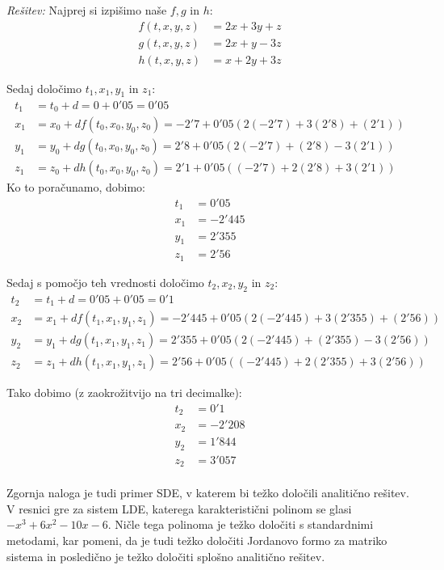 \documentclass[a4paper, 10pt]{article}
\newenvironment{resitev}{\begin{flushleft}\textit{Rešitev:}}{\hfill\end{flushleft}}
\begin{document}
		\begin{resitev}
			Najprej si izpišimo naše $f, g$ in $h$: \begin{align*}
				f(t, x, y, z) &= 2x + 3y + z\\
				g(t, x, y, z) &= 2x + y - 3z\\
				h(t, x, y, z) &= x + 2y + 3z
			\end{align*}
			
			Sedaj določimo $t_1, x_1, y_1$ in $z_1$: \begin{align*}
				t_1 &= t_0 + d = 0 + 0'05 = 0'05 \\
				x_1 &= x_0 + df(t_0, x_0, y_0, z_0) = -2'7 + 0'05(2(-2'7) + 3(2'8) + (2'1)) \\
				y_1 &= y_0 + dg(t_0, x_0, y_0, z_0) = 2'8 + 0'05(2(-2'7) + (2'8) - 3(2'1))\\
				z_1 &= z_0 + dh(t_0, x_0, y_0, z_0) = 2'1 + 0'05((-2'7) + 2(2'8) + 3(2'1))
			\end{align*}
			Ko to poračunamo, dobimo: \begin{align*}
				t_1 &= 0'05 \\
				x_1 &= -2'445 \\
				y_1 &= 2'355 \\
				z_1 &= 2'56 
			\end{align*}
			
			Sedaj s pomočjo teh vrednosti določimo $t_2, x_2, y_2$ in $z_2$:
			\begin{align*}
				t_2 &= t_1 + d = 0'05 + 0'05 = 0'1 \\
				x_2 &= x_1 + df(t_1, x_1, y_1, z_1) = -2'445 + 0'05(2(-2'445) + 3(2'355) + (2'56)) \\
				y_2 &= y_1 + dg(t_1, x_1, y_1, z_1) = 2'355 + 0'05(2(-2'445) + (2'355) - 3(2'56)) \\
				z_2 &= z_1 + dh(t_1, x_1, y_1, z_1) = 2'56 + 0'05((-2'445) + 2(2'355) + 3(2'56))
			\end{align*}
			
			Tako dobimo (z zaokrožitvijo na tri decimalke):
			\begin{align*}
				t_2 &= 0'1 \\
				x_2 &= -2'208 \\
				y_2 &= 1'844 \\
				z_2 &= 3'057 \\
			\end{align*}
		\end{resitev}
		Zgornja naloga je tudi primer SDE, v katerem bi težko določili analitično rešitev. V resnici gre za sistem LDE, katerega karakteristični polinom se glasi $-x^3 + 6x^2 - 10x - 6$. Ničle tega polinoma je težko določiti s standardnimi metodami, kar pomeni, da je tudi težko določiti Jordanovo formo za matriko sistema in posledično je težko določiti splošno analitično rešitev.
		
\end{document}
